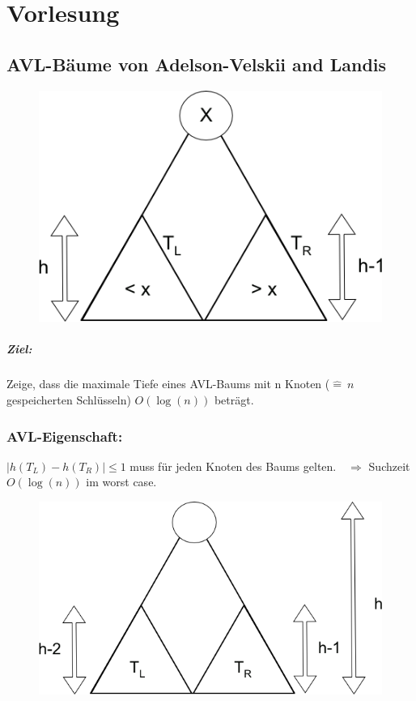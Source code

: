 \chapter{Vorlesung}
\section{AVL-Bäume von Adelson-Velskii and Landis}
\begin{figure}
	\vspace{-50pt}
\includegraphics[width=\linewidth]{11/Grafik/img1.png}
\caption{}
\end{figure}

\vspace{30pt}
\paragraph{Ziel:}%
Zeige, dass die maximale Tiefe eines AVL-Baums mit n Knoten ($\hat{=}~ n$ gespeicherten Schlüsseln) $O(\log(n))$ beträgt.
\vspace{50pt}
\subsection{AVL-Eigenschaft:} 
$|h(T_L)-h(T_R)| \leq 1$ muss für jeden Knoten des Baums gelten. $~~~\Rightarrow$ Suchzeit $O(\log(n))$ im worst case.\\
\begin{figure}
	\vspace{40pt}
	\includegraphics[width=\linewidth]{11/Grafik/img2.png}
	\caption{}
	\vspace{500pt}
\end{figure}

